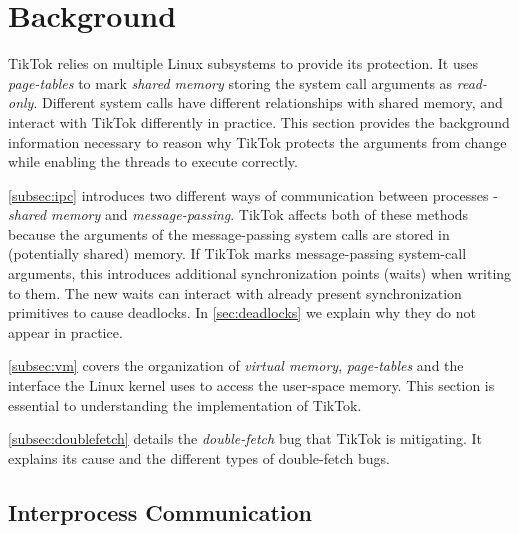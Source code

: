 \documentclass[conference]{IEEEtran}
\newcommand{\sysname}{TikTok}
\begin{document}
\section{Background}
\label{sec:background}

\sysname{} relies on multiple Linux subsystems to provide its protection. It uses
\emph{page-tables} to mark \emph{shared memory} storing the system call
arguments as \emph{read-only}. Different system calls have different
relationships with shared memory, and interact with \sysname{} differently in
practice. This section provides the background information necessary to reason
why \sysname{} protects the arguments from change while enabling the threads to
execute correctly.

\autoref{subsec:ipc} introduces two different ways of communication between
processes - \emph{shared memory} and \emph{message-passing}. \sysname{} affects
both of these methods because the arguments of the message-passing system calls
are stored in (potentially shared) memory. If \sysname{} marks message-passing
system-call arguments, this introduces additional synchronization points (waits)
when writing to them. The new waits can interact with already present
synchronization primitives to cause deadlocks. In \autoref{sec:deadlocks} we
explain why they do not appear in practice.

\autoref{subsec:vm} covers the organization of \emph{virtual memory},
\emph{page-tables} and the interface the Linux kernel uses to access the
user-space memory. This section is essential to understanding the implementation
of \sysname.

\autoref{subsec:doublefetch} details the \emph{double-fetch} bug that \sysname{}
is mitigating. It explains its cause and the different types of double-fetch bugs.


\subsection{Interprocess Communication}
\label{subsec:ipc}
\end{document}
